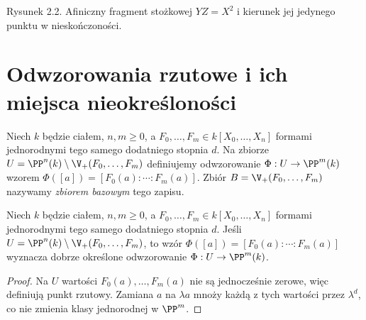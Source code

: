 \begin{center}

\small Rysunek 2.2. Afiniczny fragment stożkowej $YZ=X^2$ i kierunek
jej jedynego punktu w nieskończoności.
\end{center}

\section{Odwzorowania rzutowe i ich miejsca nieokreśloności}

\begin{definicja}
Niech $k$ będzie ciałem, $n,m\ge0$, a
$F_0,\dots,F_m\in k[X_0,\dots,X_n]$ formami jednorodnymi tego samego dodatniego stopnia $d$.
Na zbiorze $U=\PP^n(k)\setminus\V_+(F_0,\dots,F_m)$
definiujemy odwzorowanie
$\Phi:U\to\PP^m(k)$ wzorem
$\Phi([a])=[F_0(a):\cdots:F_m(a)]$.
Zbiór $B=\V_+(F_0,\dots,F_m)$ nazywamy
\emph{zbiorem bazowym} tego zapisu.
\end{definicja}

\begin{stwierdzenie}
Niech $k$ będzie ciałem, $n,m\ge0$, a
$F_0,\ldots,F_m\in k[X_0,\ldots,X_n]$
formami jednorodnymi tego samego dodatniego stopnia $d$.
Jeśli $U=\PP^n(k)\setminus\V_+(F_0,\ldots,F_m)$, to wzór
$\Phi([a])=[F_0(a):\cdots:F_m(a)]$ wyznacza dobrze określone
odwzorowanie $\Phi:U\to\PP^m(k)$.
\end{stwierdzenie}
\begin{proof}
Na $U$ wartości $F_0(a),\dots,F_m(a)$ nie są jednocześnie
zerowe, więc definiują punkt rzutowy. Zamiana $a$ na
$\lambda a$ mnoży każdą z tych wartości przez $\lambda^d$,
co nie zmienia klasy jednorodnej w $\PP^m$.
\end{proof}

